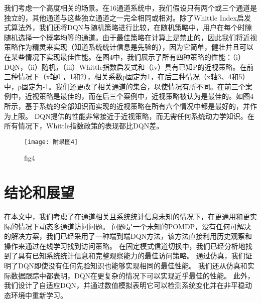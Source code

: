 我们考虑一个高度相关的场景。在16通道系统中，我们假设只有两个或三个通道是独立的，其他通道与这些独立通道之一完全相同或相对。除了Whittle Index启发式算法外，我们还将DQN与随机策略进行比较，在随机策略中，用户在每个时隙随机选择一个概率均等的通道。由于最佳策略在计算上是禁止的，因此我们将近视策略作为精灵来实现（知道系统统计信息是先验的），因为它简单，健壮并且可以在某些情况下实现最佳性能。在图4中，我们展示了所有四种策略的性能：（i）DQN，（ii）随机，（iii）Whittle指数启发式和（iv）具有已知P的近视策略。在前三种情况下（x轴0 ，1和2），相关系数ρ固定为1，在后三种情况（x轴3、4和5）中，ρ固定为-1。我们还更改了相关通道的集合，以使情况有所不同。在前三个案例中，近视策略是最佳的，而在后三个案例中，近视策略被认为是最佳的。如图4所示，基于系统的全部知识而实现的近视策略在所有六个情况中都是最好的，并作为上限。 DQN提供的性能非常接近于近视策略，而无需任何系统动力学知识。在所有情况下，Whittle指数政策的表现都比DQN差。
\begin{figure}[h]
	\centering
	\texttt{[image: 附录图4]}
	\caption{fig4}
\end{figure}
\section{  结论和展望   }

在本文中，我们考虑了在通道相关且系统统计信息未知的情况下，在更通用和更实际的情况下动态多通道访问问题。 问题是一个未知的POMDP，没有任何可解决的解决方案，我们已经采用了一种端到端DQN方法，该方法直接利用历史观察和操作来通过在线学习找到访问策略。 在固定模式信道切换中，我们已经分析地找到了具有已知系统统计信息和完整观察能力的最佳访问策略。 通过仿真，我们证明了DQN即使没有任何先验知识也能够实现相同的最佳性能。 我们还从仿真和实际数据跟踪中都表明，DQN在更复杂的情况下可以实现近乎最佳的性能。 此外，我们设计了自适应DQN，并通过数值模拟表明它可以检测系统变化并在非平稳动态环境中重新学习。

